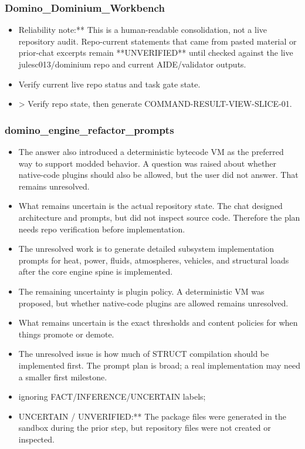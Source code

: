 \documentclass[11pt,a4paper]{report}
\begin{document}
\subsubsection{Domino\_Dominium\_Workbench}

\begin{itemize}
\item Reliability note:** This is a human-readable consolidation, not a live repository audit. Repo-current statements that came from pasted material or prior-chat excerpts remain **UNVERIFIED** until checked against the live julesc013/dominium repo and current AIDE/validator outputs.
\item Verify current live repo status and task gate state.
\item > Verify repo state, then generate COMMAND-RESULT-VIEW-SLICE-01.
\end{itemize}

\subsubsection{domino\_engine\_refactor\_prompts}

\begin{itemize}
\item The answer also introduced a deterministic bytecode VM as the preferred way to support modded behavior. A question was raised about whether native-code plugins should also be allowed, but the user did not answer. That remains unresolved.
\item What remains uncertain is the actual repository state. The chat designed architecture and prompts, but did not inspect source code. Therefore the plan needs repo verification before implementation.
\item The unresolved work is to generate detailed subsystem implementation prompts for heat, power, fluids, atmospheres, vehicles, and structural loads after the core engine spine is implemented.
\item The remaining uncertainty is plugin policy. A deterministic VM was proposed, but whether native-code plugins are allowed remains unresolved.
\item What remains uncertain is the exact thresholds and content policies for when things promote or demote.
\item The unresolved issue is how much of STRUCT compilation should be implemented first. The prompt plan is broad; a real implementation may need a smaller first milestone.
\item ignoring FACT/INFERENCE/UNCERTAIN labels;
\item UNCERTAIN / UNVERIFIED:** The package files were generated in the sandbox during the prior step, but repository files were not created or inspected.
\end{itemize}
\end{document}
